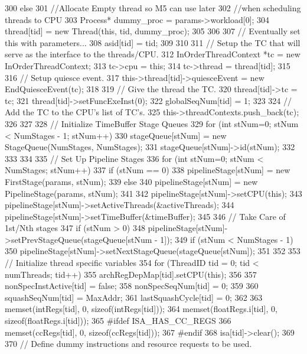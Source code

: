 \begin{DoxyCode}
{{{{300             } else {
301                 //Allocate Empty thread so M5 can use later
302                 //when scheduling threads to CPU
303                 Process* dummy_proc = params->workload[0];
304                 thread[tid] = new Thread(this, tid, dummy_proc);
305             }
306 
307             // Eventually set this with parameters...
308             asid[tid] = tid;
309         }
310 
311         // Setup the TC that will serve as the interface to the threads/CPU.
312         InOrderThreadContext *tc = new InOrderThreadContext;
313         tc->cpu = this;
314         tc->thread = thread[tid];
315 
316         // Setup quiesce event.
317         this->thread[tid]->quiesceEvent = new EndQuiesceEvent(tc);
318 
319         // Give the thread the TC.
320         thread[tid]->tc = tc;
321         thread[tid]->setFuncExeInst(0);
322         globalSeqNum[tid] = 1;
323 
324         // Add the TC to the CPU's list of TC's.
325         this->threadContexts.push_back(tc);
326     }
327 
328     // Initialize TimeBuffer Stage Queues
329     for (int stNum=0; stNum < NumStages - 1; stNum++) {
330         stageQueue[stNum] = new StageQueue(NumStages, NumStages);
331         stageQueue[stNum]->id(stNum);
332     }
333 
334 
335     // Set Up Pipeline Stages
336     for (int stNum=0; stNum < NumStages; stNum++) {
337         if (stNum == 0)
338             pipelineStage[stNum] = new FirstStage(params, stNum);
339         else
340             pipelineStage[stNum] = new PipelineStage(params, stNum);
341 
342         pipelineStage[stNum]->setCPU(this);
343         pipelineStage[stNum]->setActiveThreads(&activeThreads);
344         pipelineStage[stNum]->setTimeBuffer(&timeBuffer);
345 
346         // Take Care of 1st/Nth stages
347         if (stNum > 0)
348             pipelineStage[stNum]->setPrevStageQueue(stageQueue[stNum - 1]);
349         if (stNum < NumStages - 1)
350             pipelineStage[stNum]->setNextStageQueue(stageQueue[stNum]);
351     }
352 
353     // Initialize thread specific variables
354     for (ThreadID tid = 0; tid < numThreads; tid++) {
355         archRegDepMap[tid].setCPU(this);
356 
357         nonSpecInstActive[tid] = false;
358         nonSpecSeqNum[tid] = 0;
359 
360         squashSeqNum[tid] = MaxAddr;
361         lastSquashCycle[tid] = 0;
362 
363         memset(intRegs[tid], 0, sizeof(intRegs[tid]));
364         memset(floatRegs.i[tid], 0, sizeof(floatRegs.i[tid]));
365 #ifdef ISA_HAS_CC_REGS
366         memset(ccRegs[tid], 0, sizeof(ccRegs[tid]));
367 #endif
368         isa[tid]->clear();
369 
370         // Define dummy instructions and resource requests to be used.
}}
\end{DoxyCode}
